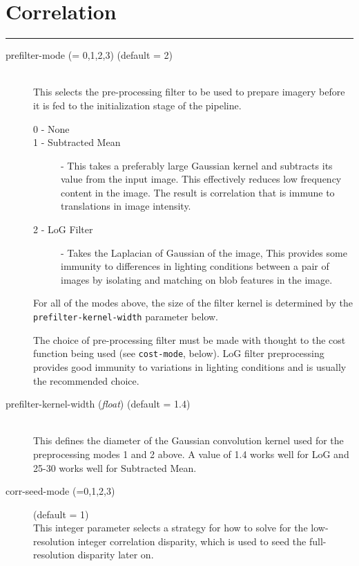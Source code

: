 \section{Correlation}
\label{corr_section}
\hrule
\bigskip

\begin{description}

\item[prefilter-mode \textnormal{\small{(= 0,1,2,3)}} (default = 2)] \hfill \\
  This selects the pre-processing filter to be used to prepare imagery
  before it is fed to the initialization stage of the pipeline.

  \begin{description}
    \item[0 - None]
    \item[1 - Subtracted Mean] - This takes a preferably large
      Gaussian kernel and subtracts its value from the input
      image. This effectively reduces low frequency content in the
      image. The result is correlation that is immune to translations
      in image intensity.
    \item[2 - LoG Filter] - Takes the Laplacian of Gaussian of the
      image, This provides some immunity to differences in lighting
      conditions between a pair of images by isolating and matching on
      blob features in the image.
  \end{description}

  For all of the modes above, the size of the filter kernel is
  determined by the \texttt{prefilter-kernel-width} parameter below.

  The choice of pre-processing filter must be made with thought to the
  cost function being used (see \texttt{cost-mode}, below).  LoG filter
  preprocessing provides good immunity to variations in lighting
  conditions and is usually the recommended choice.

\item[prefilter-kernel-width \textnormal{\small{(\emph{float})}} (default = 1.4)] \hfill \\
  This defines the diameter of the Gaussian convolution kernel used
  for the preprocessing modes 1 and 2 above. A value of 1.4 works
  well for LoG and 25-30 works well for Subtracted Mean.

\item[corr-seed-mode \textnormal{\small{(=0,1,2,3)}}] (default = 1) \hfill \\
  This integer parameter selects a strategy for how to solve for the
  low-resolution integer correlation disparity, which is used to seed
  the full-resolution disparity later on.


\end{description}
